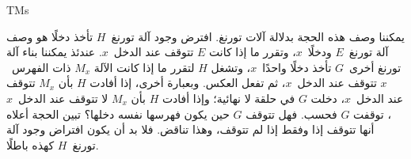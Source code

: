 \documentclass[../../../include/open-logic-section]{subfiles}
\begin{document}
\begin{tagblock}{TMs}
\begin{explain}
يمكننا وصف هذه الحجة بدلالة آلات تورنغ. افترض وجود آلة تورنغ~$H$ تأخذ
دخلًا هو وصف آلة تورنغ~$E$ ودخلًا~$x$، وتقرر ما إذا كانت $E$ تتوقف
عند الدخل~$x$. عندئذ يمكننا بناء آلة تورنغ أخرى~$G$ تأخذ دخلًا
واحدًا~$x$، وتشغل $H$ لتقرر ما إذا كانت الآلة $M_x$ ذات الفهرس~$x$
تتوقف عند الدخل~$x$، ثم تفعل العكس. وبعبارة أخرى، إذا أفادت $H$ بأن
$M_x$ تتوقف عند الدخل~$x$، دخلت $G$ في حلقة لا نهائية؛ وإذا أفادت
$H$ بأن $M_x$ لا تتوقف عند الدخل~$x$، توقفت $G$ فحسب. فهل تتوقف $G$
حين يكون فهرسها نفسه دخلها؟ تبين الحجة أعلاه أنها تتوقف إذا وفقط إذا
لم تتوقف، وهذا تناقض. فلا بد أن يكون افتراض وجود آلة تورنغ~$H$ كهذه
باطلًا.
\end{explain}
\end{tagblock}
\end{document}
